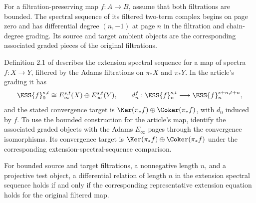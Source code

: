 \begin{definition}
\label{paper:2.1}
\label{sem:SpectralSequence:bounded-ess}
\label{def:ess}
For a filtration-preserving map $f:A\to B$, assume that both
filtrations are bounded. The spectral sequence of its filtered two-term
complex begins on page zero and has differential degree $(n,-1)$ at page
$n$ in the filtration and chain-degree grading. Its source and target
ambient objects are the corresponding associated graded pieces of the
original filtrations.

Definition 2.1 of \cite{LWX126} describes the extension spectral sequence
for a map of spectra $f:X\to Y$, filtered by the Adams filtrations on
$\pi_*X$ and $\pi_*Y$. In the article's grading it has
\[
 \ESS{f}_0^{s,t}\cong E_\infty^{s,t}(X)\oplus E_\infty^{s,t}(Y),
 \qquad
 d_n^f:\ESS{f}_n^{s,t}\longrightarrow\ESS{f}_n^{s+n,t+n},
\]
and the stated convergence target is
$\Ker(\pi_*f)\oplus\Coker(\pi_*f)$, with $d_0$ induced by $f$.
To use the bounded construction for the article's map, identify the
associated graded objects with the Adams $E_\infty$ pages through the
convergence isomorphisms. Its convergence target is $\Ker(\pi_*f)\oplus\Coker(\pi_*f)$
under the corresponding extension-spectral-sequence comparison.
\end{definition}

\begin{theorem}
\label{sem:SpectralSequence:ess-equation}
For bounded source and target filtrations, a nonnegative length $n$, and a projective test object, a differential relation of length $n$ in the extension spectral sequence holds if and only if the corresponding representative extension equation holds for the original filtered map.
\end{theorem}

